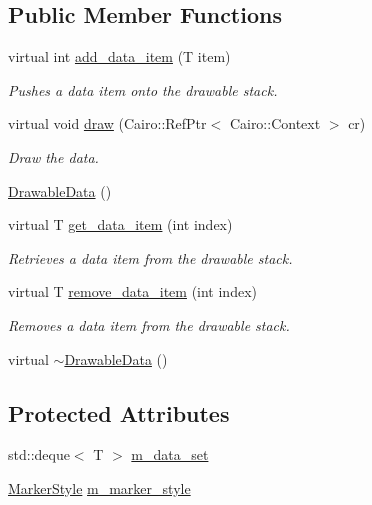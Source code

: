 \subsection*{Public Member Functions}
\begin{DoxyCompactItemize}
\item 
virtual int \hyperlink{classGtk_1_1Plot_1_1DrawableData_a7565034d7fa2fc8b9f230a3c792cecaa}{add\_\-data\_\-item} (T item)
\begin{DoxyCompactList}\small\item\em Pushes a data item onto the drawable stack. \item\end{DoxyCompactList}\item 
virtual void \hyperlink{classGtk_1_1Plot_1_1DrawableData_a275c0162df2dfdd060e859b63077614c}{draw} (Cairo::RefPtr$<$ Cairo::Context $>$ cr)
\begin{DoxyCompactList}\small\item\em Draw the data. \item\end{DoxyCompactList}\item 
\hyperlink{classGtk_1_1Plot_1_1DrawableData_a667213ec180f9292dfc6e57ddd63cd2b}{DrawableData} ()
\item 
virtual T \hyperlink{classGtk_1_1Plot_1_1DrawableData_aa36c69486f3b90c92a64ff9e26848858}{get\_\-data\_\-item} (int index)
\begin{DoxyCompactList}\small\item\em Retrieves a data item from the drawable stack. \item\end{DoxyCompactList}\item 
virtual T \hyperlink{classGtk_1_1Plot_1_1DrawableData_a94163585f0c15cdd71e293c19bcaecc4}{remove\_\-data\_\-item} (int index)
\begin{DoxyCompactList}\small\item\em Removes a data item from the drawable stack. \item\end{DoxyCompactList}\item 
virtual \hyperlink{classGtk_1_1Plot_1_1DrawableData_a56e3932c40f009ba2bea91c92a0f997a}{$\sim$DrawableData} ()
\end{DoxyCompactItemize}
\subsection*{Protected Attributes}
\begin{DoxyCompactItemize}
\item 
std::deque$<$ T $>$ \hyperlink{classGtk_1_1Plot_1_1DrawableData_ac8c6f3506d6286cfb432ed9a3f411c75}{m\_\-data\_\-set}
\item 
\hyperlink{namespaceGtk_1_1Plot_aa310e5a0b3e79b5d145978cdfdff19f7}{MarkerStyle} \hyperlink{classGtk_1_1Plot_1_1DrawableData_a4eb6eed74d1be1a72e093ce307b8f27f}{m\_\-marker\_\-style}
\end{DoxyCompactItemize}
